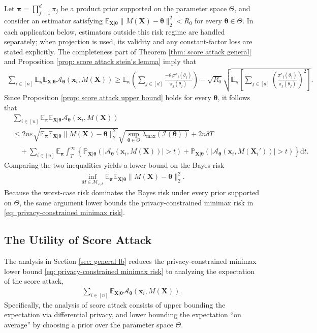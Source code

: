 \documentclass[letterpaper,12pt]{article}
\renewcommand{\d}{\mathrm{d}}
\numberwithin{equation}{section}
\theoremstyle{plain}
\numberwithin{Theorem}{section}
\numberwithin{proposition}{section}
\numberwithin{Lemma}{section}
{
	\theoremstyle{definition}
	\newtheorem{Definition}{Definition}
	\newtheorem{example}{Example}
	\numberwithin{example}{section}
	\newtheorem{fact}{Fact}
	\numberwithin{fact}{section}
	\newtheorem{remark}{Remark}
}
\newcommand{\rev}[1]{#1}
\newcommand{\furtherrev}[1]{#1}
\newcommand{\A}{\mathcal{A}}
\newcommand{\Pro}{\mathbb{P}}
\newcommand{\1}{\mathbbm{1}}
\def\bth{{\boldsymbol{\theta}}}
\def\E{\mathbb{E}}
\begin{document}
Let $\bm \pi=\prod_{j=1}^d\pi_j$ be a product prior supported on the parameter space $\Theta$, and \rev{consider an estimator satisfying} $\E_{\bm X|\bth} \|M(\bm X) - \bth\|_2^2 < \furtherrev{R_0}$ for every $\bth \in \Theta$. \rev{In each application below, estimators outside this risk regime are handled separately; when projection is used, its validity and any constant-factor loss are stated explicitly.} The completeness part of Theorem \ref{thm: score attack general} and Proposition \ref{prop: score attack stein's lemma} imply that
\begin{align*}
	\sum_{i \in [n]} \E_{\bm \pi}\E_{\bm X|\bth} \A_\bth (\bm x_i, M(\bm X)) \geq \E_{\bm \pi} \left(\sum_{j \in [d]} \frac{-\theta_j \pi'_j(\theta_j)}{\pi_j(\theta_j)}\right) - \sqrt{\furtherrev{R_0}}\sqrt{  \E_{\bm \pi} \left[\sum_{j \in [d]}\left(\frac{\pi'_j(\theta_j)}{\pi_j(\theta_j)}\right)^2\right]}.
\end{align*}
Since Proposition \ref{prop: score attack upper bound} holds for every $\bth$, it follows that
	\begin{align*}
		&\sum_{i \in [n]} \E_{\bm \pi}\E_{\bm X|\bth} \A_\bth (\bm x_i, M(\bm X)) \\
			&\leq 2n\varepsilon \sqrt{\E_{\bm \pi} \E_{\bm X|\bth}\|M(\bm X) - \bth\|_2^2}
			\sqrt{\sup_{\bth\in\Theta}\lambda_{\max}(\mathcal I(\bth))} + 2n\delta T \\
			&\quad + \sum_{i \in [n]}\E_{\bm\pi}\int_T^\infty
			\left\{\Pro_{\bm X|\bth}\left(|\A_\bth(\bm x_i, M(\bm X))| > t \right)
			+\Pro_{\bm X|\bth}\left(|\A_\bth(\bm x_i, M(\bm X_i'))| > t \right)\right\}\d t.
\end{align*}
Comparing the two inequalities yields a lower bound on the Bayes risk
\begin{align*}
\inf_{M \in \mathcal M_{\varepsilon, \delta}} \E_{\bm \pi}
\E_{\bm X|\bth}\|M(\bm X)-\bth\|_2^2.
\end{align*}
Because the worst-case risk dominates the Bayes risk under every prior
supported on $\Theta$, the same argument lower bounds the privacy-constrained
minimax risk in \eqref{eq: privacy-constrained minimax risk}.

\subsection{The Utility of Score Attack}
The analysis in Section \ref{sec: general lb} reduces the privacy-constrained minimax lower bound \eqref{eq: privacy-constrained minimax risk} to analyzing the expectation of the score attack,
\begin{align*}
	\sum_{i \in [n]} \E_{\bm X|\bth} \A_\bth (\bm x_i, M(\bm X)).
\end{align*}
Specifically, the analysis of score attack consists of upper bounding the expectation via differential privacy, and lower bounding the expectation ``on average'' by choosing a prior over the parameter space $\Theta$.
\end{document}
